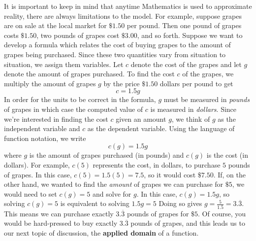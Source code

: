 \medskip

It is important to keep in mind that anytime Mathematics is used to approximate reality, there are always limitations to the model.  For example, suppose grapes are on sale at the local market for $\$1.50$ per pound. Then one pound of grapes costs $\$1.50$, two pounds of grapes cost $\$3.00$, and so forth.  Suppose we want to develop a formula which relates the cost of buying grapes to the amount of grapes being purchased.  Since these two quantities vary from situation to situation, we assign them variables.  Let $c$ denote the cost of the grapes and let $g$ denote the amount of grapes purchased. To find the cost $c$ of the grapes, we multiply the amount of grapes $g$ by the price $\$1.50$ dollars per pound to get \[c = 1.5 g\]  In order for the units to be correct in the formula, $g$ must be measured in \textit{pounds} of grapes in which case the computed value of $c$ is measured in \textit{dollars}.  Since we're interested in finding the cost $c$ given an amount $g$, we think of $g$ as the independent variable and $c$ as the dependent variable.  Using the language of function notation, we write \[c(g) = 1.5 g\] where $g$ is the amount of grapes purchased (in pounds) and $c(g)$ is the cost (in dollars).  For example, $c(5)$ represents the cost, in dollars, to purchase $5$ pounds of grapes. In this case, $c(5) = 1.5(5) = 7.5$, so it would cost $\$ 7.50$. If, on the other hand, we wanted to find the \textit{amount} of grapes we can purchase for $\$5$, we would need to set $c(g) = 5$ and solve for $g$.  In this case, $c(g)=1.5g$, so solving  $c(g) = 5$ is equivalent to solving $1.5g = 5$  Doing so gives $g = \frac{5}{1.5} = 3.\overline{3}$. This means we can purchase exactly $3.\overline{3}$ pounds of grapes for $\$5$.  Of course, you would be hard-pressed to buy exactly $3.\overline{3}$ pounds of grapes, and this leads us to our next topic of discussion, the \textbf{applied domain} of a function.

\medskip

